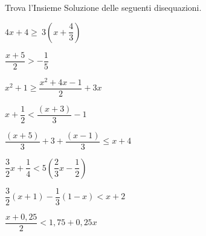 \begin{esercizio}[\Ast]
 \label{ese:dis_14}
Trova l'Insieme Soluzione delle seguenti disequazioni.
 \begin{multicols}{2}
 \begin{enumeratea}
\item \(4x+4\ge~3\left(x+\dfrac{4}{3}\right)\)
\item \(\dfrac{x+5}{2}>-{\dfrac{1}{5}}\)
\item \(x^2+1\ge\dfrac{x^2+4x-1}{2}+3x\)
\item \(x+\dfrac{1}{2}<\dfrac{(x+3)}{3}-1\)
\item \(\dfrac{(x+5)}{3}+3+\dfrac{(x-1)}{3}\le x+4\)
\item \(\dfrac{3}{2}x+\dfrac{1}{4}<5\left(\dfrac{2}{3}x-\dfrac{1}{2}\right)\)
\item \(\dfrac{3}{2}(x+1)-\dfrac{1}{3}(1-x)<x+2\)
\item \(\dfrac{x+0,25}{2}<1,75+0,25x\)
\end{enumeratea}
\end{multicols}
\end{esercizio}

\newpage   %

\subsubsection*{}


